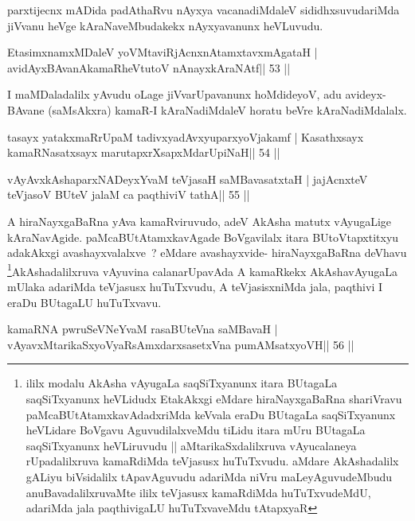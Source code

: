 \begin{artha}
parxtijecnx mADida padAthaRvu nAyxya vacanadiMdaleV sididhxsuvudariMda jiVvanu heVge kAraNaveMbudakekx nAyxyavanunx heVLuvudu.
\end{artha}

\begin{shl}
EtasimxnamxMDaleV yoV\s MtaviRjAcnxnAtamxtavxmAgataH |
avidAyxBAvanAkamaRheVtutoV nAnayxkAraNAtf\hfill || 53 ||
\end{shl}

\begin{artha}
I maMDaladalilx yAvudu oLage jiVvarUpavanunx hoMdideyoV, adu
avideyx-BAvane (saMsAkxra) kamaR-I kAraNadiMdaleV horatu beVre kAraNadiMdalalx.
\end{artha}

\begin{shl}
tasayx yatakxmaRrUpaM tadivxyadAvxyuparxyoVjakamf |
Kasathxsayx kamaRNasatxsayx marutapxrXsapxMdarUpiNaH\hfill || 54 ||
\end{shl}

\begin{shl}
vAyAvxkAshaparxNADeyxYvaM teVjasaH saMBavasatxtaH |
jajAcnxteV teVjasoV BUteV jalaM ca paqthiviV tathA\hfill || 55 ||
\end{shl}

\begin{artha}
A hiraNayxgaBaRna yAva kamaRviruvudo, adeV AkAsha matutx vAyugaLige
kAraNavAgide. paMcaBUtAtamxkavAgade BoVgavilalx itara BUtoVtapxtitxyu
adakAkxgi avashayxvalalxve~? eMdare avashayxvide- hiraNayxgaBaRna
deVhavu \footnote{ililx modalu AkAsha vAyugaLa saqSiTxyanunx itara
BUtagaLa saqSiTxyanunx heVLidudx EtakAkxgi eMdare hiraNayxgaBaRna
shariVravu paMcaBUtAtamxkavAdadxriMda keVvala eraDu BUtagaLa
saqSiTxyanunx heVLidare BoVgavu AguvudilalxveMdu tiLidu itara mUru
BUtagaLa saqSiTxyanunx heVLiruvudu || aMtarikaSxdalilxruva
vAyucalaneya rUpadalilxruva kamaRdiMda teVjasusx huTuTxvudu. aMdare
AkAshadalilx gALiyu biVsidalilx tApavAguvudu adariMda niVru
maLeyAguvudeMbudu anuBavadalilxruvaMte ililx teVjasusx kamaRdiMda
huTuTxvudeMdU, adariMda jala paqthivigaLU huTuTxvaveMdu tAtapxyaR}AkAshadalilxruva vAyuvina calanarUpavAda A
kamaRkekx AkAshavAyugaLa mUlaka adariMda teVjasusx huTuTxvudu, A
teVjasisxniMda jala, paqthivi I eraDu BUtagaLU huTuTxvavu.
\end{artha}

\begin{shl}
kamaRNA pwruSeVNeYvaM rasaBUteVna saMBavaH |
vAyavxMtarikaSxyoVyaRsAmxdarxsasetxVna pumAMsatxyoVH\hfill || 56 ||
\end{shl}

